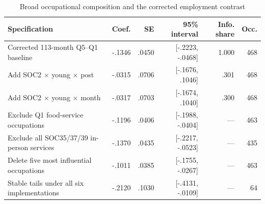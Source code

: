 \begin{table}[!htbp]
\centering
\caption{Broad occupational composition and the corrected employment contrast}\label{tab:support}
\begin{threeparttable}
\small
\setlength{\tabcolsep}{3.5pt}
\begin{tabularx}{\textwidth}{@{}Yrrrrr@{}}
\toprule
Specification & Coef. & SE & 95\% interval & Info. share & Occ. \\
\midrule
Corrected 113-month Q5--Q1 baseline & -.1346 & .0450 & [-.2223, -.0468] & 1.000 & 468 \\
Add SOC2 $\times$ young $\times$ post & -.0315 & .0706 & [-.1676, .1046] & .301 & 468 \\
Add SOC2 $\times$ young $\times$ month & -.0317 & .0703 & [-.1674, .1040] & .300 & 468 \\
\midrule
Exclude Q1 food-service occupations & -.1196 & .0406 & [-.1988, -.0404] & --- & 463 \\
Exclude all SOC35/37/39 in-person services & -.1370 & .0435 & [-.2217, -.0523] & --- & 435 \\
Delete five most influential occupations & -.1011 & .0385 & [-.1755, -.0267] & --- & 463 \\
Stable tails under all six implementations & -.2120 & .1030 & [-.4131, -.0109] & --- & 64 \\
\bottomrule
\end{tabularx}
\end{threeparttable}
\end{table}
